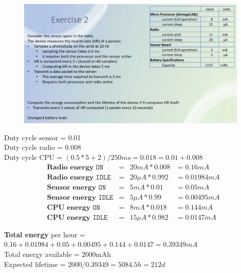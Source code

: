 

\begin{figure}[htbp]
   \centering
   \includegraphics{images/energy_exercise1.png}
   \label{fig:energy_exercise1}
\end{figure}

Duty cycle sensor = 0.01\\
Duty cycle radio = 0.008\\
Duty cycle CPU = $(0.5 * 5 + 2)/250ms = 0.018 = 0.01 + 0.008$
\nl
\begin{align*}
   &\textbf{Radio energy} \texttt{ ON} &=& 20mA * 0.008 &= 0.16mA\\ 
   &\textbf{Radio energy} \texttt{ IDLE} &=& 20\mu A *0.992 &= 0.01984mA\\
   &\textbf{Sensor energy} \texttt{ ON} &=& 5mA *0.01 &= 0.05mA\\
   &\textbf{Sensor energy} \texttt{ IDLE} &=& 5\mu A *0.99 &= 0.00495mA\\
   &\textbf{CPU energy} \texttt{ ON} &=& 8mA * 0.018 &= 0.144mA\\
   &\textbf{CPU energy} \texttt{ IDLE} &=& 15\mu A * 0.982 &= 0.0147mA
\end{align*}

\textbf{Total energy} per hour =\\
$0.16 + 0.01984 + 0.05 + 0.00495 + 0.144 + 0.0147 = 0.39349mA$\\
Total energy available = 2000mAh\\
Expected lifetime = $2000 / 0.39349 = 5084.5h = 212d$

